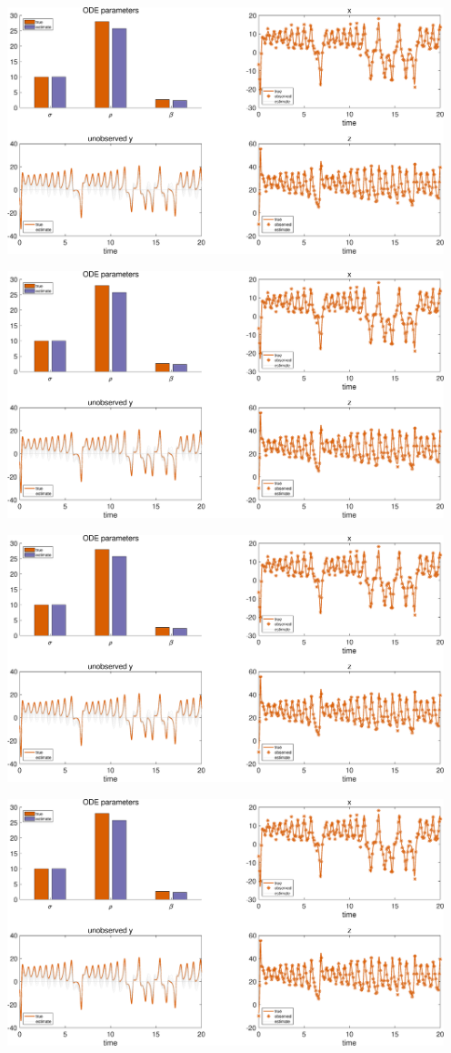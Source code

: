 {\includegraphics [width=5in]{Lorenz_attractor_4_20.eps}

\includegraphics [width=5in]{Lorenz_attractor_4_21.eps}

\includegraphics [width=5in]{Lorenz_attractor_4_22.eps}

\includegraphics [width=5in]{Lorenz_attractor_4_23.eps}

}
